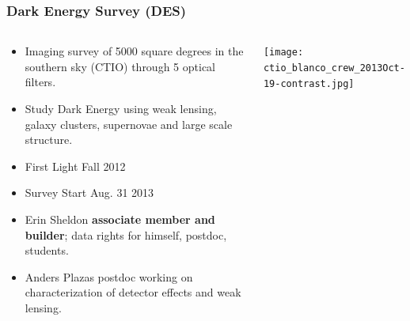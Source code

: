 \documentclass{beamer}
\begin{document}

\frame
{
    \frametitle{Dark Energy Survey (DES)}

    \fontsize{9}{0.8\baselineskip}
    \begin{columns}
        \begin{column}{0.5\textwidth}    
            \begin{itemize}
                \item Imaging survey of 5000 square degrees in the 
                    southern sky (CTIO) through 5 optical filters.
                \item Study Dark Energy using weak lensing, galaxy clusters, supernovae
                    and large scale structure.
                \item First Light Fall 2012
                \item Survey Start Aug. 31 2013
                \item Erin Sheldon {\bf associate member and builder}; data rights for
                    himself, postdoc, students.
                \item Anders Plazas postdoc working on characterization of detector
                    effects and weak lensing.
            \end{itemize}
        \end{column}
        \begin{column}{0.5\textwidth}
            \texttt{[image: ctio\_blanco\_crew\_2013Oct-19-contrast.jpg]}
        \end{column}
    \end{columns}
}
\end{document}
